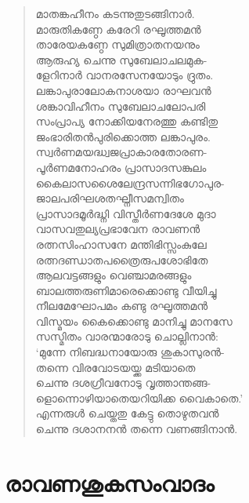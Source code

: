 \begin{verse}
മാതങ്കഹീനം കടന്നുതുടങ്ങിനാര്‍.\\
മാരുതികണ്ഠേ കരേറി രഘൂത്തമന്‍\\
താരേയകണ്ഠേ സുമിത്രാതനയനും\\
ആരുഹ്യ ചെന്നു സുബേലാചലമുക-\\
ളേറിനാര്‍ വാനരസേനയോടും ദ്രുതം.\\
ലങ്കാപുരാലോകനാശയാ രാഘവന്‍\\
ശങ്കാവിഹീനം സുബേലാചലോപരി\\
സംപ്രാപ്യ നോക്കിയനേരത്തു കണ്ടിതു\\
ജംഭാരിതന്‍പുരിക്കൊത്ത ലങ്കാപുരം.\\
സ്വര്‍ണമയദ്ധ്വജപ്രാകാരതോരണ-\\
പൂര്‍ണമനോഹരം പ്രാസാദസങ്കുലം\\
കൈലാസശൈലേന്ദ്രസന്നിഭഗോപുര-\\
ജാലപരിഘശതഘ്നീസമന്വിതം\\
പ്രാസാദമൂര്‍ദ്ധ്നി വിസ്തീര്‍ണദേശേ മുദാ\\
വാസവതുല്യപ്രഭാവേന രാവണന്‍\\
രത്നസിംഹാസനേ മന്തിഭിസ്സംകുലേ\\
രത്നദണ്ഡാതപത്രൈരുപശോഭിതേ\\
ആലവട്ടങ്ങളും വെഞ്ചാമരങ്ങളും\\
ബാലത്തരുണിമാരെക്കൊണ്ടു വീയിച്ചു\\
നീലമേഘോപമം കണ്ടു രഘൂത്തമന്‍\\
വിസ്മയം കൈക്കൊണ്ടു മാനിച്ചു മാനസേ\\
സസ്മിതം വാരന്മാരോടു ചൊല്ലിനാന്‍:\\
‘മുന്നേ നിബദ്ധനായോരു ശുകാസുരന്‍-\\
തന്നെ വിരവോടയയ്ക്ക മടിയാതെ\\
ചെന്നു ദശഗ്രീവനോടു വൃത്താന്തങ്ങ-\\
ളൊന്നൊഴിയാതെയറിയിക്ക വൈകാതെ.’\\
എന്നരുള്‍ ചെയ്തതു കേട്ടു തൊഴുതവന്‍\\
ചെന്നു ദശാനനന്‍ തന്നെ വണങ്ങിനാന്‍.
\end{verse}


\section{രാവണശുകസംവാദം}

